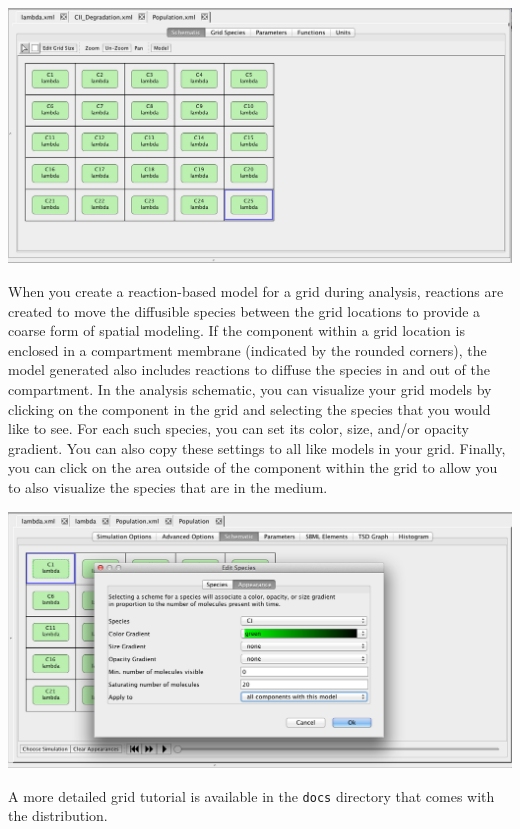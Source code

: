 \documentclass[titlepage,11pt]{article}
\begin{document}
\begin{center}
\includegraphics[width=160mm]{screenshots/gridModel}
\end{center}

When you create a reaction-based model for a grid during analysis, reactions are created to move the diffusible species between the grid locations to provide a coarse form of spatial modeling.  If the component within a grid location is enclosed in a compartment membrane (indicated by the rounded corners), the model generated also includes reactions to diffuse the species in and out of the compartment.  In the analysis schematic, you can visualize your grid models by clicking on the component in the grid and selecting the species that you would like to see.  For each such species, you can set its color, size, and/or opacity gradient.  You can also copy these settings to all like models in your grid.  Finally, you can click on the area outside of the component within the grid to allow you to also visualize the species that are in the medium.

\begin{center}
\includegraphics[width=160mm]{screenshots/compAppearances}
\end{center}


\noindent
A more detailed 
grid tutorial
is available in the {\tt docs} directory that comes with the distribution.
\end{document}
